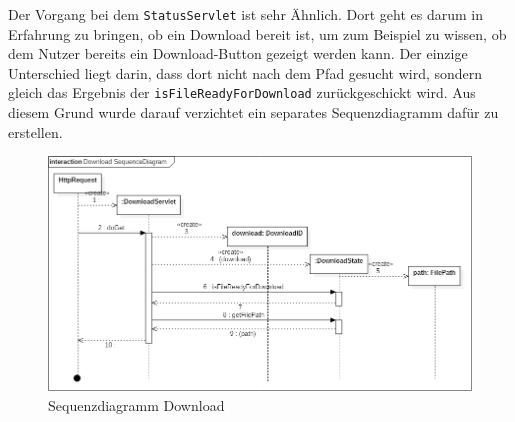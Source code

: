 Der Vorgang bei dem \texttt{StatusServlet} ist sehr Ähnlich. Dort geht es darum in Erfahrung zu bringen, ob ein Download bereit ist, um zum Beispiel zu wissen, ob dem Nutzer bereits ein Download-Button gezeigt werden kann. Der einzige Unterschied liegt darin, dass dort nicht nach dem Pfad gesucht wird, sondern gleich das Ergebnis der \texttt{isFileReadyForDownload} zurückgeschickt wird. Aus diesem Grund wurde darauf verzichtet ein separates Sequenzdiagramm dafür zu erstellen.
\begin{figure}[!hbp]
	\centering
	\includegraphics[width=\linewidth]{images/export/DownloadSequenceDiagram.png}
	\caption{Sequenzdiagramm Download}
\end{figure}
